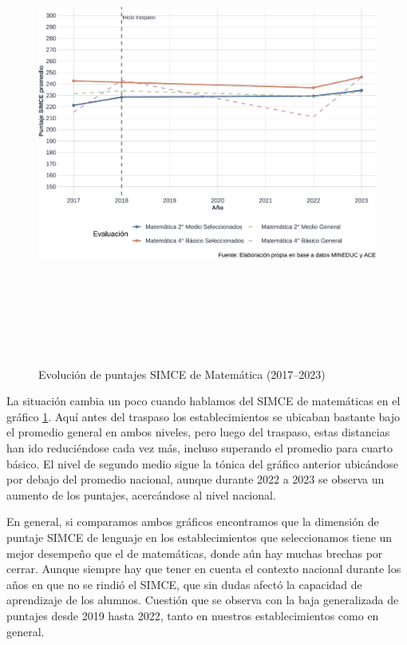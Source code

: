 \documentclass[
  12pt,
  letterpaper,
]{article}
\begin{document}
\begin{figure}

{\centering \includegraphics[width=0.8\linewidth,height=6in]{tesis_ver_final_files/figure-latex/grafico-simce-m-1} 

}

\caption{Evolución de puntajes SIMCE de Matemática (2017–2023)}\label{fig:grafico-simce-m}
\end{figure}

La situación cambia un poco cuando hablamos del SIMCE de matemáticas en el gráfico \ref{fig:grafico-simce-m}.
Aquí antes del traspaso los establecimientos se ubicaban bastante bajo el promedio general en ambos niveles, pero luego del traspaso, estas distancias han ido reduciéndose cada vez más, incluso superando el promedio para cuarto básico.
El nivel de segundo medio sigue la tónica del gráfico anterior ubicándose por debajo del promedio nacional, aunque durante 2022 a 2023 se observa un aumento de los puntajes, acercándose al nivel nacional.

En general, si comparamos ambos gráficos encontramos que la dimensión de puntaje SIMCE de lenguaje en los establecimientos que seleccionamos tiene un mejor desempeño que el de matemáticas, donde aún hay muchas brechas por cerrar.
Aunque siempre hay que tener en cuenta el contexto nacional durante los años en que no se rindió el SIMCE, que sin dudas afectó la capacidad de aprendizaje de los alumnos.
Cuestión que se observa con la baja generalizada de puntajes desde 2019 hasta 2022, tanto en nuestros establecimientos como en general.
\end{document}
